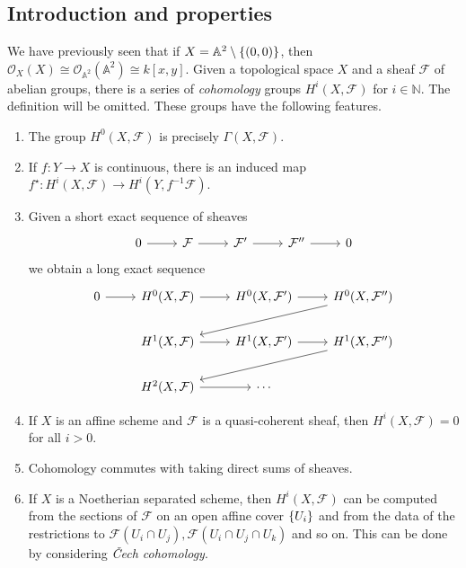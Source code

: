 \subsection{Introduction and properties}
We have previously seen that if \( X = \mathbb A^2 \setminus \qty{(0, 0)} \), then \( \mathcal O_X(X) \cong \mathcal O_{\mathbb A^2}(\mathbb A^2) \cong k[x, y] \).
Given a topological space \( X \) and a sheaf \( \mathcal F \) of abelian groups, there is a series of \emph{cohomology} groups \( H^i(X, \mathcal F) \) for \( i \in \mathbb N \).
The definition will be omitted.
These groups have the following features.
\begin{enumerate}
    \item The group \( H^0(X, \mathcal F) \) is precisely \( \Gamma(X, \mathcal F) \).
    \item If \( f : Y \to X \) is continuous, there is an induced map \( f^\star : H^i(X, \mathcal F) \to H^i(Y, f^{-1} \mathcal F) \).
    \item Given a short exact sequence of sheaves
\[\begin{tikzcd}
	0 & {\mathcal F} & {\mathcal F'} & {\mathcal F''} & 0
	\arrow[from=1-1, to=1-2]
	\arrow[from=1-2, to=1-3]
	\arrow[from=1-3, to=1-4]
	\arrow[from=1-4, to=1-5]
\end{tikzcd}\]
    we obtain a long exact sequence
\[\begin{tikzcd}
	0 & {H^0(X, \mathcal F)} & {H^0(X, \mathcal F')} & {H^0(X, \mathcal F'')} \\
	& {H^1(X, \mathcal F)} & {H^1(X, \mathcal F')} & {H^1(X, \mathcal F'')} \\
	& {H^2(X, \mathcal F)} & \cdots
	\arrow[from=1-1, to=1-2]
	\arrow[from=1-2, to=1-3]
	\arrow[from=1-3, to=1-4]
	\arrow[from=1-4, to=2-2]
	\arrow[from=2-2, to=2-3]
	\arrow[from=2-3, to=2-4]
	\arrow[from=2-4, to=3-2]
	\arrow[from=3-2, to=3-3]
\end{tikzcd}\]
	\item If \( X \) is an affine scheme and \( \mathcal F \) is a quasi-coherent sheaf, then \( H^i(X, \mathcal F) = 0 \) for all \( i > 0 \).
	\item Cohomology commutes with taking direct sums of sheaves.
	\item If \( X \) is a Noetherian separated scheme, then \( H^i(X, \mathcal F) \) can be computed from the sections of \( \mathcal F \) on an open affine cover \( \qty{U_i} \) and from the data of the restrictions to \( \mathcal F(U_i \cap U_j), \mathcal F(U_i \cap U_j \cap U_k) \) and so on.
	This can be done by considering \emph{\v{C}ech cohomology}.
\end{enumerate}

